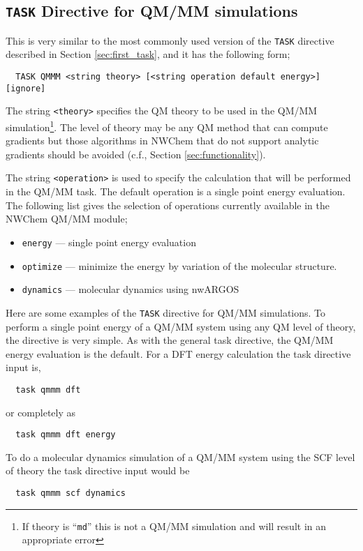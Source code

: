 \subsection{{\tt TASK} Directive for QM/MM simulations}

This is very similar to the most commonly used version of the
\verb+TASK+ directive described in Section \ref{sec:first_task}, and
it has the following form;

\begin{verbatim}
  TASK QMMM <string theory> [<string operation default energy>] [ignore]
\end{verbatim}

The string \verb+<theory>+ specifies the QM theory to be used in the
QM/MM simulation\footnote{If theory is ``{\tt md}'' this is not a QM/MM
simulation and will result in an appropriate error}.  The level of
theory may be any QM method that can compute gradients but those
algorithms in NWChem that do not support analytic gradients should be
avoided (c.f., Section \ref{sec:functionality}).  

The string \verb+<operation>+ is used to specify the calculation that will
be performed in the QM/MM task.  The default operation is a single point energy
evaluation.  The following list gives the selection of operations currently
available in the NWChem QM/MM module;
\begin{itemize}
\item \verb+energy+ --- single point energy evaluation
\item \verb+optimize+ --- minimize the energy by variation of the molecular
   structure.  
\item \verb+dynamics+ --- molecular dynamics using nwARGOS
\end{itemize}

Here are some examples of the \verb+TASK+ directive for QM/MM
simulations.  To perform a single point energy of a QM/MM system using
any QM level of theory, the directive is very simple. As with the
general task directive, the QM/MM energy evaluation is the
default. For a DFT energy calculation the task directive input is,
\begin{verbatim}
  task qmmm dft
\end{verbatim}
or completely as
\begin{verbatim}
  task qmmm dft energy
\end{verbatim}

To do a molecular dynamics simulation of a QM/MM system using the SCF
level of theory the task directive input would be
\begin{verbatim}
  task qmmm scf dynamics
\end{verbatim}

